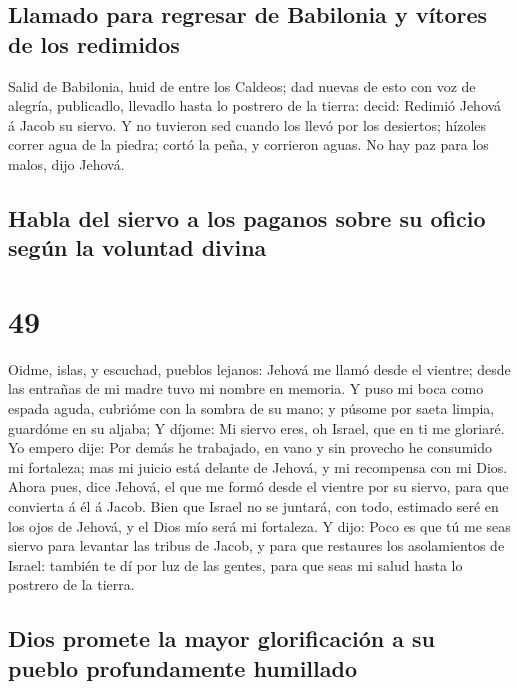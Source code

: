 \hypertarget{llamado-para-regresar-de-babilonia-y-vuxedtores-de-los-redimidos}{%
\subsection{Llamado para regresar de Babilonia y vítores de los
redimidos}\label{llamado-para-regresar-de-babilonia-y-vuxedtores-de-los-redimidos}}

 Salid de Babilonia, huid de entre los Caldeos; dad nuevas
de esto con voz de alegría, publicadlo, llevadlo hasta lo postrero de la
tierra: decid: Redimió Jehová á Jacob su siervo.  Y no
tuvieron sed cuando los llevó por los desiertos; hízoles correr agua de
la piedra; cortó la peña, y corrieron aguas.  No hay paz
para los malos, dijo Jehová.

\hypertarget{habla-del-siervo-a-los-paganos-sobre-su-oficio-seguxfan-la-voluntad-divina}{%
\subsection{Habla del siervo a los paganos sobre su oficio según la
voluntad
divina}\label{habla-del-siervo-a-los-paganos-sobre-su-oficio-seguxfan-la-voluntad-divina}}

\hypertarget{section-48}{%
\section{49}\label{section-48}}

 Oidme, islas, y escuchad, pueblos lejanos: Jehová me llamó
desde el vientre; desde las entrañas de mi madre tuvo mi nombre en
memoria.  Y puso mi boca como espada aguda, cubrióme con la
sombra de su mano; y púsome por saeta limpia, guardóme en su aljaba;
 Y díjome: Mi siervo eres, oh Israel, que en ti me gloriaré.
 Yo empero dije: Por demás he trabajado, en vano y sin
provecho he consumido mi fortaleza; mas mi juicio está delante de
Jehová, y mi recompensa con mi Dios.  Ahora pues, dice
Jehová, el que me formó desde el vientre por su siervo, para que
convierta á él á Jacob. Bien que Israel no se juntará, con todo,
estimado seré en los ojos de Jehová, y el Dios mío será mi fortaleza.
 Y dijo: Poco es que tú me seas siervo para levantar las
tribus de Jacob, y para que restaures los asolamientos de Israel:
también te dí por luz de las gentes, para que seas mi salud hasta lo
postrero de la tierra.

\hypertarget{dios-promete-la-mayor-glorificaciuxf3n-a-su-pueblo-profundamente-humillado}{%
\subsection{Dios promete la mayor glorificación a su pueblo
profundamente
humillado}\label{dios-promete-la-mayor-glorificaciuxf3n-a-su-pueblo-profundamente-humillado}}


